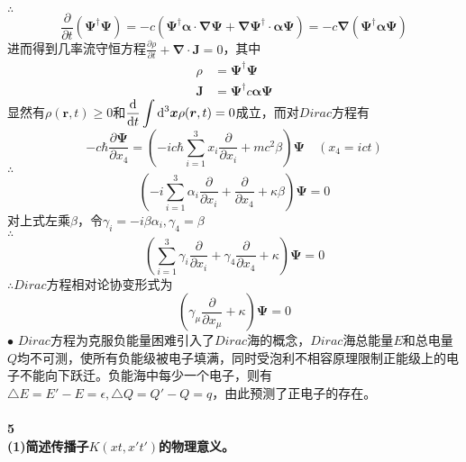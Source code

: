 \documentclass[12pt]{article}
\numberwithin{equation}{section}	 %
\begin{document}
\begin{spacing}{1.5}
\begin{equation}
\end{equation}
$\therefore$
\begin{equation}
\frac{\partial}{\partial t}\left( \bm\Psi^{\dagger}\bm\Psi \right) = -c \left( \bm\Psi^{\dagger}\bm{\alpha \cdot \nabla}\bm\Psi + \bm{\nabla\Psi^{\dagger}\cdot\alpha}\bm\Psi \right) = -c\bm\nabla\left( \bm\Psi^{\dagger}\bm\alpha\bm\Psi \right)
\end{equation}
进而得到几率流守恒方程$\displaystyle \frac{\partial \rho}{\partial t} + \bm{\nabla \cdot J}=0$，其中
\begin{equation}
\begin{aligned}
\rho &= \bm\Psi^{\dagger}\bm\Psi \\
\bm{J} &= \bm\Psi^{\dagger}c\bm\alpha\bm\Psi
\end{aligned}
\end{equation}
显然有$\rho(\bm{r},t) \ge 0$和$\displaystyle \frac{\mathop{}\!\mathrm{d}}{\mathop{}\!\mathrm{d} t}\int\mathop{}\!\mathrm{d}^{3}\bm{x}\rho(\bm{r},t) = 0$成立，而对$Dirac$方程有
\begin{equation}
-c\hbar\frac{\partial\bm\Psi}{\partial x_{4}} = \left( -ic\hbar\sum_{i=1}^{3}x_{i}\frac{\partial}{\partial x_{i}} + mc^{2}\beta \right) \bm\Psi \quad (x_{4}=ict)
\end{equation}
$\therefore$
\begin{equation}
\left( -i\sum_{i=1}^{3}\alpha_{i}\frac{\partial}{\partial x_{i}} + \frac{\partial}{\partial x_{4}} + \kappa\beta \right) \bm\Psi = 0
\end{equation}
对上式左乘$\beta$，令$\gamma_{i}=-i\beta\alpha_{i},\gamma_{4}=\beta$\\
$\therefore$
\begin{equation}
\left( \sum_{i=1}^{3}\gamma_{i}\frac{\partial}{\partial x_{i}} + \gamma_{4}\frac{\partial}{\partial x_{4}} + \kappa \right) \bm\Psi = 0
\end{equation}
$\therefore  Dirac$方程相对论协变形式为
\begin{equation}
\left( \gamma_{\mu}\frac{\partial}{\partial x_{\mu}} + \kappa \right) \bm\Psi = 0
\end{equation}
$\bullet$ $Dirac$方程为克服负能量困难引入了$Dirac$海的概念，$Dirac$海总能量$E$和总电量$Q$均不可测，使所有负能级被电子填满，同时受泡利不相容原理限制正能级上的电子不能向下跃迁。负能海中每少一个电子，则有$\triangle E = E'-E=\epsilon, \triangle Q = Q'-Q=q$，由此预测了正电子的存在。
~\\
~\\
\textbf{5 \quad \\
(1)简述传播子$K(xt,x't')$的物理意义。\\
}
\end{spacing}
\end{document}
